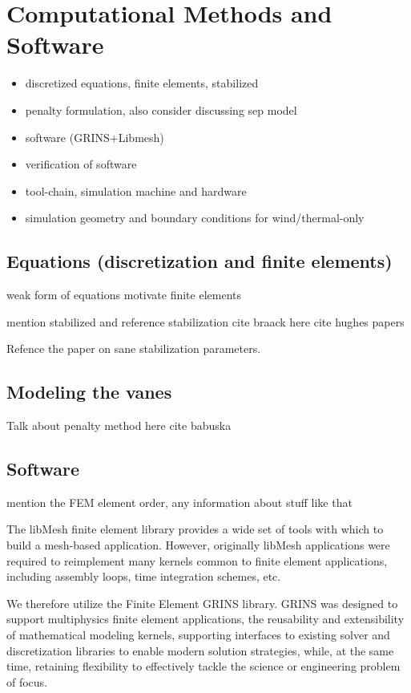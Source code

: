\section{Computational Methods and Software}
\label{sec:software}

\begin{itemize}
\item discretized equations, finite elements, stabilized
\item penalty formulation, also consider discussing sep model
\item software (GRINS+Libmesh)
\item verification of software
\item tool-chain, simulation machine and hardware
\item simulation geometry and boundary conditions for wind/thermal-only
\end{itemize}

\subsection{Equations (discretization and finite elements)}

weak form of equations
motivate finite elements

mention stabilized and reference stabilization
cite braack here
cite hughes papers

Refence the paper on sane stabilization parameters. 

\subsection{Modeling the vanes}

Talk about penalty method here
cite babuska

\subsection{Software}

mention the FEM element order, any information about stuff like that

The libMesh\cite{libmesh} finite element library
provides a wide set of tools with which to build a mesh-based
application. However, originally libMesh applications were required to
reimplement many kernels common to finite element applications,
including assembly loops, time integration schemes, etc. 

We therefore utilize the Finite Element GRINS library\cite{grins}.
GRINS was designed to support multiphysics finite element
applications, the reusability and extensibility of mathematical
modeling kernels, supporting interfaces to existing solver and
discretization libraries to enable modern solution strategies, while, at
the same time, retaining flexibility to effectively tackle the science
or engineering problem of focus. 

